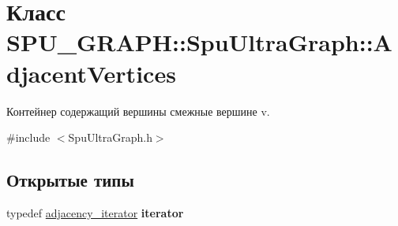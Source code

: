\hypertarget{class_s_p_u___g_r_a_p_h_1_1_spu_ultra_graph_1_1_adjacent_vertices}{}\section{Класс S\+P\+U\+\_\+\+G\+R\+A\+PH\+:\+:Spu\+Ultra\+Graph\+:\+:Adjacent\+Vertices}
\label{class_s_p_u___g_r_a_p_h_1_1_spu_ultra_graph_1_1_adjacent_vertices}


Контейнер содержащий вершины смежные вершине v.  




{\ttfamily \#include $<$Spu\+Ultra\+Graph.\+h$>$}

\subsection*{Открытые типы}
\begin{DoxyCompactItemize}
\item 
\mbox{\label{class_s_p_u___g_r_a_p_h_1_1_spu_ultra_graph_1_1_adjacent_vertices_a12561c9d0f9fcf509dab4a5b61ffe1ff}} 
typedef \hyperlink{class_s_p_u___g_r_a_p_h_1_1_spu_ultra_graph_ae50dab54e277cf22d3e318d468e7585c}{adjacency\+\_\+iterator} {\bfseries iterator}
\end{DoxyCompactItemize}
